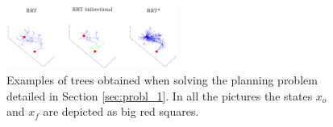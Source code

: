 \begin{figure}
	\centering
	\includegraphics[width=0.5\textwidth]{Immagini/pdf/Tree_comparison_Chiara.pdf}
\caption{Examples of trees obtained when solving the planning problem detailed in Section \ref{sec:probl_1}. In all the pictures the states $x_o$ and $x_f$ are depicted as big red squares. 
 }
	\label{fig:Tree_Comparison}
\end{figure}